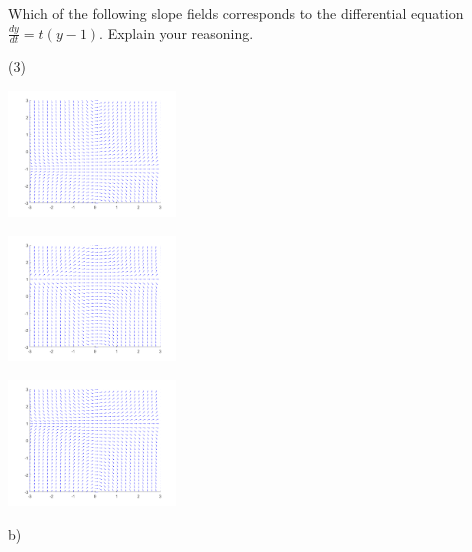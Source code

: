 \begin{exercise}
Which of the following slope fields corresponds to the differential equation $\frac{dy}{dt} = t(y-1)$. Explain your reasoning.
\begin{tasks}(3)
\task
\parbox[c]{1.75in}{\includegraphics[width=1.75in]{Images/yprimetyp1slope}}
\task
\parbox[c]{1.75in}{\includegraphics[width=1.75in]{Images/yprimetsqym1slope}}
\task
\parbox[c]{1.75in}{\includegraphics[width=1.75in]{Images/yprimetym1slope}}
\end{tasks}
\end{exercise}
\comboSol{%
}
{%
b)
}

